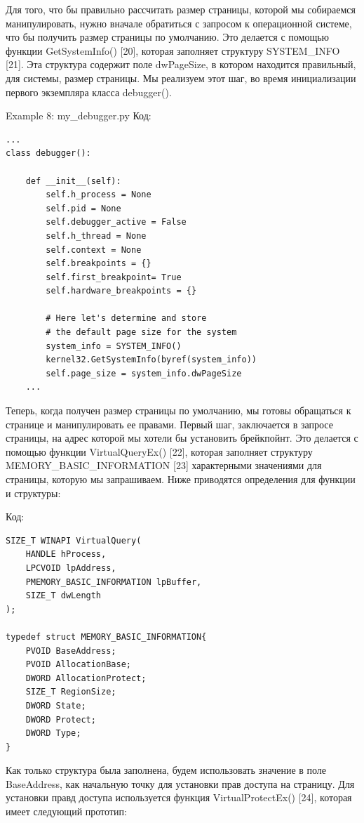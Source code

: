 \documentclass[12pt]{book}
\begin{document}
Для того, что бы правильно рассчитать размер страницы, которой мы собираемся манипулировать, нужно вначале обратиться с запросом к операционной системе, что бы получить размер страницы по умолчанию. Это делается с помощью функции GetSystemInfo() [20], которая заполняет структуру SYSTEM\_INFO [21]. Эта структура содержит поле dwPageSize, в котором находится правильный, для системы, размер страницы. Мы реализуем этот шаг, во время инициализации первого экземпляра класса debugger().

Example 8: my\_debugger.py
Код:
\begin{lstlisting}
...
class debugger():

    def __init__(self):
        self.h_process = None
        self.pid = None
        self.debugger_active = False
        self.h_thread = None
        self.context = None
        self.breakpoints = {}
        self.first_breakpoint= True
        self.hardware_breakpoints = {}

        # Here let's determine and store
        # the default page size for the system
        system_info = SYSTEM_INFO()
        kernel32.GetSystemInfo(byref(system_info))
        self.page_size = system_info.dwPageSize
    ...
\end{lstlisting}

Теперь, когда получен размер страницы по умолчанию, мы готовы обращаться к странице и манипулировать ее правами. Первый шаг, заключается в запросе страницы, на адрес которой мы хотели бы установить брейкпойнт. Это делается с помощью функции VirtualQueryEx() [22], которая заполняет структуру MEMORY\_BASIC\_INFORMATION [23] характерными значениями для страницы, которую мы запрашиваем. Ниже приводятся определения для функции и структуры:

Код:
\begin{lstlisting}
SIZE_T WINAPI VirtualQuery(
    HANDLE hProcess,
    LPCVOID lpAddress,
    PMEMORY_BASIC_INFORMATION lpBuffer,
    SIZE_T dwLength
);

typedef struct MEMORY_BASIC_INFORMATION{
    PVOID BaseAddress;
    PVOID AllocationBase;
    DWORD AllocationProtect;
    SIZE_T RegionSize;
    DWORD State;
    DWORD Protect;
    DWORD Type;
}
\end{lstlisting}

Как только структура была заполнена, будем использовать значение в поле BaseAddress, как начальную точку для установки прав доступа на страницу. Для установки правд доступа используется функция VirtualProtectEx() [24], которая имеет следующий прототип:
\end{document}
